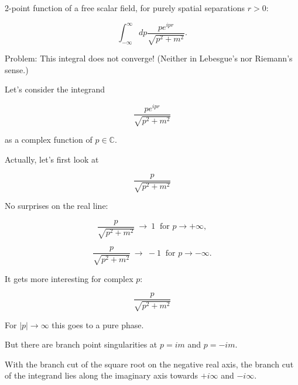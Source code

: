 \documentclass{beamer}
\newcommand{\envelope}{\frac{p}{\sqrt{p^2 + m^2}}}
\newcommand{\integrand}{\frac{p e^{ipr}}{\sqrt{p^2 + m^2}}}
\newcommand{\CC}{\mathbb{C}}
\begin{document}
\begin{frame}
2-point function of a free scalar field, for purely spatial separations $r > 0$:

$$\int_{-\infty}^{\infty} dp \integrand.$$

Problem: This integral does not converge! (Neither in Lebesgue's
nor Riemann's sense.)
\end{frame}


\begin{frame}
Let's consider the integrand

$$\integrand$$

as a complex function of $p \in \CC$.

\end{frame}


\begin{frame}
Actually, let's first look at

$$\envelope$$

No surprises on the real line:

$$\envelope \ \rightarrow \ 1 \ \textrm{ for } p \rightarrow +\infty,$$

$$\envelope \ \rightarrow \ -1 \ \textrm{ for } p \rightarrow -\infty.$$

\end{frame}




\begin{frame}
It gets more interesting for complex $p$:

$$\envelope$$

For $|p| \rightarrow \infty$ this goes to  a pure phase.

But there are branch point singularities at $p = im$ and $p = -im$.

With the branch cut of the square root on the negative real axis,
the branch  cut of the integrand lies along the imaginary axis towards $+i\infty$ and $-i\infty$.
\end{frame}

\end{document}
